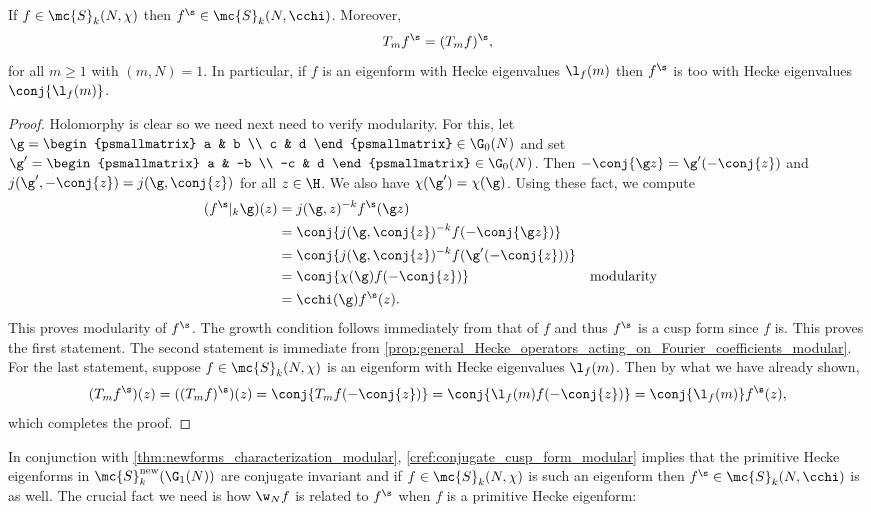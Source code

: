 \documentclass[12pt]{article}
\begin{document}
      \begin{proposition}\label{cref:conjugate_cusp_form_modular}
        If \(f \in \mc{S}_{k}(N,\chi)\) then \(f^{\s} \in \mc{S}_{k}(N,\cchi)\). Moreover,
        \[
          T_{m}f^{\s} = (T_{m}f)^{\s},
        \]
        for all \(m \ge 1\) with \((m,N) = 1\). In particular, if \(f\) is an eigenform with Hecke eigenvalues \(\l_{f}(m)\) then \(f^{\s}\) is too with Hecke eigenvalues \(\conj{\l_{f}(m)}\).
      \end{proposition}
      \begin{proof}
        Holomorphy is clear so we need next need to verify modularity. For this, let \(\g = \begin{psmallmatrix} a & b \\ c & d \end{psmallmatrix} \in \G_{0}(N)\) and set \(\g' = \begin{psmallmatrix} a & -b \\ -c & d \end{psmallmatrix} \in \G_{0}(N)\). Then \(-\conj{\g z} = \g'(-\conj{z})\) and \(j(\g',-\conj{z}) = j(\g,\conj{z})\) for all \(z \in \H\). We also have \(\chi(\g') = \chi(\g)\). Using these fact, we compute
        \begin{align*}
          (f^{\s}|_{k}\g)(z) &= j(\g,z)^{-k}f^{\s}(\g z) \\
          &= \conj{j(\g,\conj{z})^{-k}f(-\conj{\g z})} \\
          &= \conj{j(\g,\conj{z})^{-k}f(\g'(-\conj{z}))} \\
          &= \conj{\chi(\g)f(-\conj{z})} && \text{modularity} \\
          &= \cchi(\g)f^{\s}(z).
        \end{align*}
        This proves modularity of \(f^{\s}\). The growth condition follows immediately from that of \(f\) and thus \(f^{\s}\) is a cusp form since \(f\) is. This proves the first statement. The second statement is immediate from \cref{prop:general_Hecke_operators_acting_on_Fourier_coefficients_modular}. For the last statement, suppose \(f \in \mc{S}_{k}(N,\chi)\) is an eigenform with Hecke eigenvalues \(\l_{f}(m)\). Then by what we have already shown,
        \[
          (T_{m}f^{\s})(z) = ((T_{m}f)^{\s})(z) = \conj{T_{m}f(-\conj{z})} = \conj{\l_{f}(m)f(-\conj{z})} = \conj{\l_{f}(m)}f^{\s}(z),
        \]
        which completes the proof.
      \end{proof}
      
      In conjunction with \cref{thm:newforms_characterization_modular}, \cref{cref:conjugate_cusp_form_modular} implies that the primitive Hecke eigenforms in \(\mc{S}_{k}^{\mathrm{new}}(\G_{1}(N))\) are conjugate invariant and if \(f \in \mc{S}_{k}(N,\chi)\) is such an eigenform then \(f^{\s} \in \mc{S}_{k}(N,\cchi)\) is as well. The crucial fact we need is how \(\w_{N}f\) is related to \(f^{\s}\) when \(f\) is a primitive Hecke eigenform:
\end{document}
